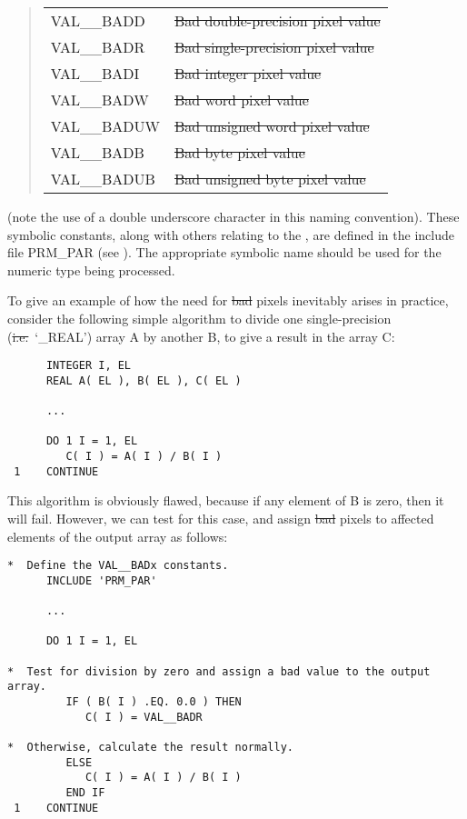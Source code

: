 \small
\begin{quote}
\begin{center}
\begin{tabular}{l@{ --- }l}
VAL\_\_BADD & \st{Bad double-precision pixel value}\\
VAL\_\_BADR & \st{Bad single-precision pixel value}\\
VAL\_\_BADI & \st{Bad integer pixel value}\\
VAL\_\_BADW & \st{Bad word pixel value}\\
VAL\_\_BADUW & \st{Bad unsigned word pixel value}\\
VAL\_\_BADB & \st{Bad byte pixel value}\\
VAL\_\_BADUB & \st{Bad unsigned byte pixel value}
\end{tabular}
\end{center}
\end{quote}
\normalsize

(note the use of a double underscore character in this naming convention).
These symbolic constants, along with others relating to the , are defined
in the include file PRM\_PAR (see ).
The appropriate symbolic name should be used for the numeric type being
processed. 


To give an example of how the need for \st{bad\/} pixels inevitably arises in
practice, consider the following simple algorithm to divide one
single-precision (\st{i.e.}\ `\_REAL') array A by another B, to give a result
in the array C: 

\small
\begin{verbatim}
      INTEGER I, EL
      REAL A( EL ), B( EL ), C( EL )

      ...

      DO 1 I = 1, EL
         C( I ) = A( I ) / B( I )
 1    CONTINUE
\end{verbatim}
\normalsize

This algorithm is obviously flawed, because if any element of B is zero,
then it will fail. 
However, we can test for this case, and assign \st{bad\/} pixels to affected
elements of the output array as follows: 

\small
\begin{verbatim}
*  Define the VAL__BADx constants.
      INCLUDE 'PRM_PAR'

      ...

      DO 1 I = 1, EL

*  Test for division by zero and assign a bad value to the output array.
         IF ( B( I ) .EQ. 0.0 ) THEN
            C( I ) = VAL__BADR

*  Otherwise, calculate the result normally.
         ELSE
            C( I ) = A( I ) / B( I )
         END IF
 1    CONTINUE
\end{verbatim}
\normalsize

